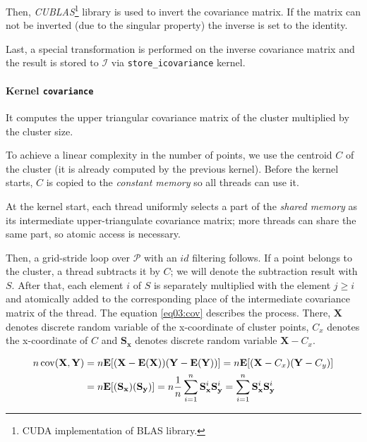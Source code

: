 Then, \emph{CUBLAS}\footnote{CUDA implementation of BLAS library.} library is used to invert the covariance matrix. If the matrix can not be inverted (due to the singular property) the inverse is set to the identity. 

Last, a special transformation is performed on the inverse covariance matrix and the result is stored to $\mathcal{I}$ via \texttt{store\_icovariance} kernel.

\paragraph{Kernel \texttt{covariance}}
It computes the upper triangular covariance matrix of the cluster multiplied by the cluster size. 

To achieve a linear complexity in the number of points, we use the centroid $C$ of the cluster (it is already computed by the previous kernel). Before the kernel starts, $C$ is copied to the \emph{constant memory} so all threads can use it.

At the kernel start, each thread uniformly selects a part of the \emph{shared memory} as its intermediate upper-triangulate covariance matrix; more threads can share the same part, so atomic access is necessary.

Then, a grid-stride loop over $\mathcal{P}$ with an $id$ filtering follows. If a point belongs to the cluster, a thread subtracts it by $C$; we will denote the subtraction result with $S$. After that, each element $i$ of $S$ is separately multiplied with the element $j \ge i$ and atomically added to the corresponding place of the intermediate covariance matrix of the thread. The equation \ref{eq03:cov} describes the process. There, $\textbf{X}$ denotes discrete random variable of the x-coordinate of cluster points, $C_x$ denotes the x-coordinate of $C$ and $\mathbf{S_x}$ denotes discrete random variable $\mathbf{X}-C_x$.

\begin{equation}
\begin{split}
n\operatorname{cov}(\mathbf{X},\mathbf{Y}) &= n\mathbf{E}[(\mathbf{X}-\mathbf{E}(\mathbf{X}))(\mathbf{Y}-\mathbf{E}(\mathbf{Y}))] = n\mathbf{E}[(\mathbf{X}-C_x)(\mathbf{Y}-C_y)] \\ &= n\mathbf{E}[(\mathbf{S_x})(\mathbf{S_y})] = n\frac{1}{n}\sum_{i=1}^{n}{\mathbf{S}_{\mathbf{x}}^{i}\mathbf{S}_{\mathbf{y}}^{i}} = \sum_{i=1}^{n}{\mathbf{S}_{\mathbf{x}}^{i}\mathbf{S}_{\mathbf{y}}^{i}}
\end{split}
\label{eq03:cov}
\end{equation}

